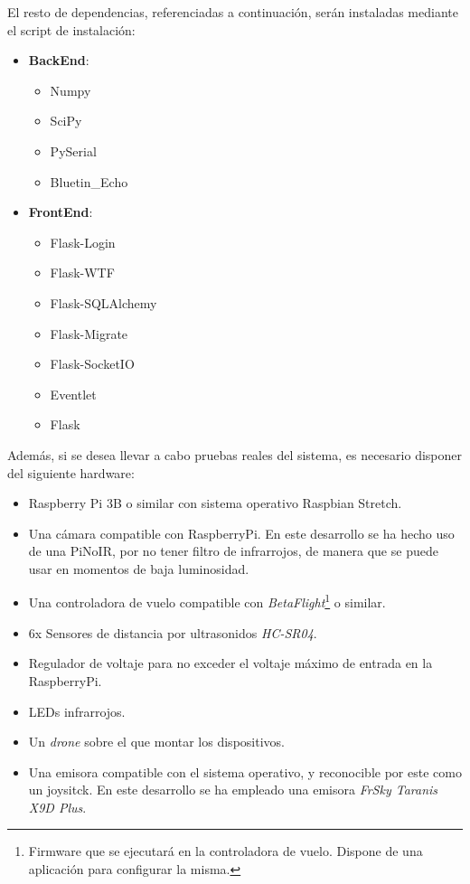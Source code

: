 El resto de dependencias, referenciadas a continuación, serán instaladas mediante el script de instalación:
\begin{itemize}
\item \textbf{BackEnd}:
\begin{itemize}
	\item Numpy
	\item SciPy
	\item PySerial
	\item Bluetin\_Echo
\end{itemize}
\item \textbf{FrontEnd}:
\begin{itemize}
	\item Flask-Login
	\item Flask-WTF
	\item Flask-SQLAlchemy
	\item Flask-Migrate
	\item Flask-SocketIO
	\item Eventlet
	\item Flask
\end{itemize}
\end{itemize}


Además, si se desea llevar a cabo pruebas reales del sistema, es necesario disponer del siguiente hardware: 

\begin{itemize}
\item Raspberry Pi 3B o similar con sistema operativo Raspbian Stretch.
\item Una cámara compatible con RaspberryPi. En este desarrollo se ha hecho uso de una PiNoIR, por no tener filtro de infrarrojos, de manera que se puede usar en momentos de baja luminosidad.
\item Una controladora de vuelo compatible con \textit{BetaFlight}\footnote{Firmware que se ejecutará en la controladora de vuelo. Dispone de una aplicación para configurar la misma.} o similar. 
\item 6x Sensores de distancia por ultrasonidos \textit{HC-SR04}.
\item Regulador de voltaje para no exceder el voltaje máximo de entrada en la RaspberryPi. 
\item LEDs infrarrojos.
\item Un \emph{drone} sobre el que montar los dispositivos.
\item Una emisora compatible con el sistema operativo, y reconocible por este como un joysitck. En este desarrollo se ha empleado una emisora \textit{FrSky Taranis X9D Plus}.
\end{itemize}

